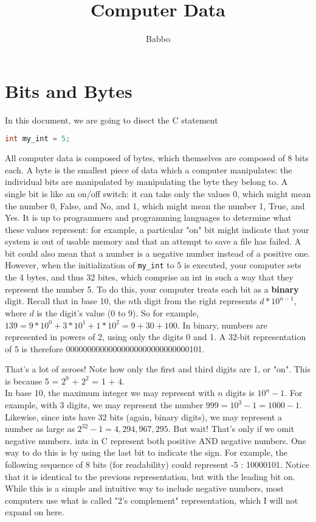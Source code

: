 \documentclass{article}
\begin{document}
\author{Babbo}
\date{}
\title{Computer Data}

\maketitle

\section*{Bits and Bytes}
In this document, we are going to disect the C statement

\begin{lstlisting}[language=C]
int my_int = 5;
\end{lstlisting}

All computer data is composed of bytes, which themselves are composed of 8 bits each. A byte is the smallest piece
of data which a computer manipulates: the individual bits are manipulated by manipulating the byte they belong to.
A single bit is like an on/off switch: it can take only the values 0, which might mean the number 0, False, and No,
and 1, which might mean the number 1, True, and Yes. It is up to programmers and programming languages to determine
what these values represent: for example, a particular "on" bit might indicate that your system is out of usable memory
and that an attempt to save a file has failed. A bit could also mean that a number is a negative number instead of 
a positive one. However, when the initialization of \verb|my_int| to 5 is executed, your computer sets the 4 bytes, and
thus 32 bites, which comprise an int in such a way that they represent the number 5. To do this, your computer treats
each bit as a \textbf{binary} digit. Recall that in base 10, the $n$th digit from the right represents $d * 10^{n - 1}$,
where $d$ is the digit's value (0 to 9). So for example, $139 = 9 * 10^0+ 3 * 10^1 + 1 * 10^2 = 9 + 30 + 100$. In 
binary, numbers are represented in powers of 2, using only the digits 0 and 1. A 32-bit representation of 5 is therefore
00000000000000000000000000000101.

That's a lot of zeroes! Note how only the first and third digits are 1, or "on". 
This is because 5 = $2^0$ + $2^2$ = 1 + 4. \\

In base 10, the maximum integer we may represent with $n$ digits is $10^n - 1$. For example, with 3 digits, we may
represent the number $999 = 10^3 - 1 = 1000 - 1$. Likewise, since ints have 32 bits (again, binary digits), we may
represent a number as large as $2^32 - 1 = 4,294,967,295$. But wait! That's only if we omit negative numbers. ints in
C represent both positive AND negative numbers. One way to do this is by using the last bit to indicate the sign. For 
example, the following sequence of 8 bits (for readability) could represent -5 : 10000101. Notice that it is 
identical to the previous representation, but with the leading bit on. While this is a simple and intuitive way to
include negative numbers, most computers use what is called "2's complement" representation, which I will not expand on
here.
\end{document}
